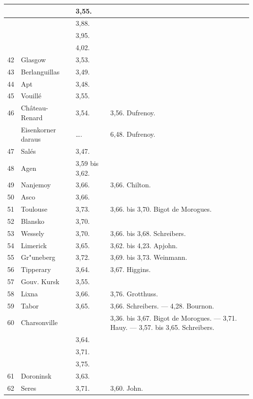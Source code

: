 \documentclass[a4paper, 11pt, oneside, polutonikogreek, german]{article}
\begin{document}
\begin{center}
\begin{longtable}{|p{7mm}|p{32mm}|p{30mm}|p{30mm}|}
          &   & 3,55. &   \\ \hline
          &   & 3,88. &   \\ \hline
          &   & 3,95. &   \\ \hline
          &   & 4,02. &   \\ \hline
        42 & Glasgow & 3,53. &   \\ \hline
        43 & Berlanguillas & 3,49. &   \\ \hline
        44 & Apt & 3,48. &   \\ \hline
        45 & Vouillé & 3,55. &   \\ \hline
        46 & Château-Renard & 3,54. & 3,56. Dufrenoy. \\ \hline
          & Eisenkorner daraus & …. & 6,48. Dufrenoy. \\ \hline
        47 & Salés & 3,47. &   \\ \hline
        48 & Agen & 3,59 bis 3,62. &   \\ \hline
        49 & Nanjemoy & 3,66. & 3,66. Chilton. \\ \hline
        50 & Asco & 3,66. &   \\ \hline
        51 & Toulouse & 3,73. & 3,66. bis 3,70. Bigot de Morogues. \\ \hline
        52 & Blansko & 3,70. &   \\ \hline
        53 & Wessely & 3,70. & 3,66. bis 3,68. Schreibers. \\ \hline
        54 & Limerick & 3,65. & 3,62. bis 4,23. Apjohn. \\ \hline
        55 & Gr"uneberg & 3,72. & 3,69. bis 3,73. Weinmann. \\ \hline
        56 & Tipperary & 3,64. & 3,67. Higgins. \\ \hline
        57 & Gouv. Kursk & 3,55. &   \\ \hline
        58 & Lixna & 3,66. & 3,76. Grotthuss. \\ \hline
        59 & Tabor & 3,65. & 3,66. Schreibers. --- 4,28. Bournon. \\ \hline
        60 & Charsonville &   & 3,36. bis 3,67. Bigot de Morogues. --- 3,71. Hauy. --- 3,57. bis 3,65. Schreibers. \\ \hline
          &   & 3,64. &   \\ \hline
          &   & 3,71. &   \\ \hline
          &   & 3,75. &   \\ \hline
        61 & Doroninsk & 3,63. &   \\ \hline
        62 & Seres & 3,71. & 3,60. John. \\ \hline

\end{longtable}
\end{center}
\end{document}
